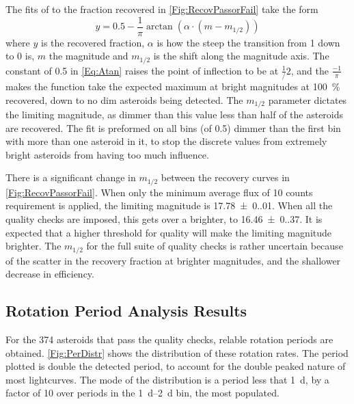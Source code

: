 \documentclass{UCreport}
\begin{document}
The fits of to the fraction recovered in \autoref{Fig:RecovPassorFail} take the form
\begin{equation} \label{Eq:Atan}
  y= 0.5 -\frac{1}{\pi} \arctan(\alpha \cdot (m-m_{1/2}))
\end{equation}
where $y$ is the recovered fraction, $\alpha$ is how the steep the transition from 1 down to 0 is,  $m$ the magnitude and $m_{1/2}$ is the shift along the magnitude axis.
The constant of 0.5 in \autoref{Eq:Atan} raises the point of inflection to be at $\frac 1/2$, and the $\frac{-1}{\pi}$ makes the function take the expected maximum at bright magnitudes at \qty{100}{\percent} recovered, down to no dim asteroids being detected.
The $m_{1/2}$ parameter dictates the limiting magnitude, as dimmer than this value less than half of the asteroids are recovered.
The fit is preformed on all bins (of \qty{0.5}{\mag}) dimmer than the first bin with more than one asteroid in it, to stop the discrete values from extremely bright asteroids from having too much influence.

There is a significant change in $m_{1/2}$ between the recovery curves in \autoref{Fig:RecovPassorFail}.
When only the minimum average flux of 10 counts requirement is applied, the limiting magnitude is \qty{17.78(0.01)}{\mag}.
When all the quality checks are imposed, this gets over a \unit{\mag} brighter, to \qty{16.46(0.37)}{\mag}.
It is expected that a higher threshold for quality will make the limiting magnitude brighter.
The $m_{1/2}$ for the full suite of quality checks is rather  uncertain because of the scatter in the recovery fraction at brighter magnitudes, and the shallower decrease in efficiency.


\subsection{Rotation Period Analysis Results}\label{SubSec:PerRes}

For the 374 asteroids that pass the quality checks, relable rotation periods are obtained.
\autoref{Fig:PerDistr} shows the distribution of these rotation rates. 
The period plotted is double the detected period, to account for the double peaked nature of most lightcurves.
The mode of the distribution is a period less that \qty{1}{\day}, by a factor of 10 over periods in the \qtyrange{1}{2}{\day} bin, the  most populated.  
\end{document}
